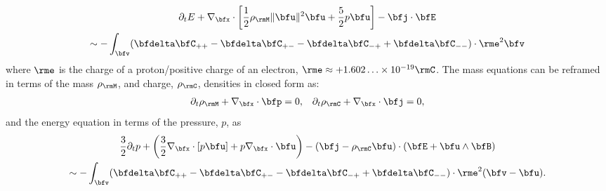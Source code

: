     \vspace{-25pt}
    \begin{multline}
        \partial_{t}E + \nabla_{\bfx}\cdot\left[\frac{1}{2}\rho_{\rmM}\|\bfu\|^{2}\bfu + \frac{5}{2}p\bfu\right] - \bfj\cdot\bfE  \\
        \sim  - \int_{\bfv}(\bfdelta\bfC_{++} - \bfdelta\bfC_{+-} - \bfdelta\bfC_{-+} + \bfdelta\bfC_{--})\cdot\rme^{2}\bfv
    \end{multline}
    where $\rme$ is the charge of a proton/positive charge of an electron, $\rme  \approx  + 1.602\ldots\times 10^{- 19}\rmC$. The mass equations can be reframed in terms of the mass $\rho_{\rmM}$, and charge, $\rho_{\rmC}$, densities in closed form as:
    \begin{align}
        \partial_{t}\rho_{\rmM} + \nabla_{\bfx}\cdot\bfp  =  0,  &&
        \partial_{t}\rho_{\rmC} + \nabla_{\bfx}\cdot\bfj  =  0,
    \end{align}
    and the energy equation in terms of the pressure, $p$, as
    \begin{multline}
        \frac{3}{2}\partial_{t}p + \left(\frac{3}{2}\nabla_{\bfx}\cdot[p\bfu] + p\nabla_{\bfx}\cdot\bfu\right) - (\bfj - \rho_{\rmC}\bfu)\cdot(\bfE + \bfu\wedge\bfB)  \\
        \sim  - \int_{\bfv}(\bfdelta\bfC_{++} - \bfdelta\bfC_{+-} - \bfdelta\bfC_{-+} + \bfdelta\bfC_{--})\cdot\rme^{2}(\bfv - \bfu).  \label{eqn:energy conservation introduction}
    \end{multline}

    